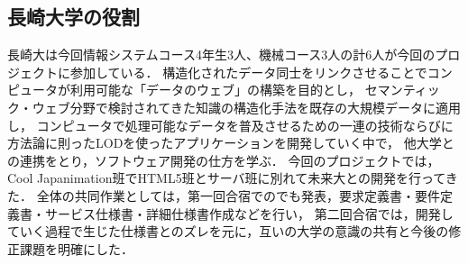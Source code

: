 \subsection{長崎大学の役割}
\par
長崎大は今回情報システムコース4年生3人、機械コース3人の計6人が今回のプロジェクトに参加している．
構造化されたデータ同士をリンクさせることでコンピュータが利用可能な「データのウェブ」の構築を目的とし，
セマンティック・ウェブ分野で検討されてきた知識の構造化手法を既存の大規模データに適用し，
コンピュータで処理可能なデータを普及させるための一連の技術ならびに方法論に則ったLODを使ったアプリケーションを開発していく中で，
他大学との連携をとり，ソフトウェア開発の仕方を学ぶ．
今回のプロジェクトでは，Cool Japanimation班でHTML5班とサーバ班に別れて未来大との開発を行ってきた．
全体の共同作業としては，第一回合宿でのでも発表，要求定義書・要件定義書・サービス仕様書・詳細仕様書作成などを行い，
第二回合宿では，開発していく過程で生じた仕様書とのズレを元に，互いの大学の意識の共有と今後の修正課題を明確にした．

